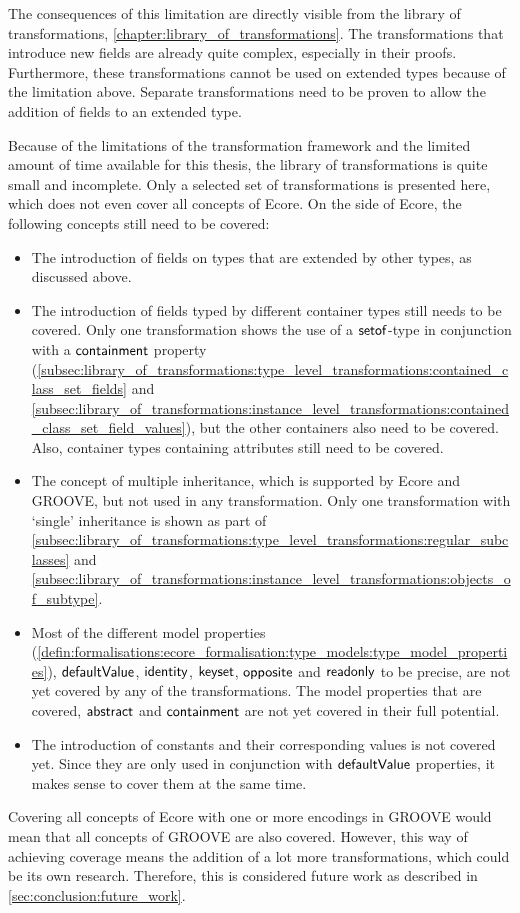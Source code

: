 The consequences of this limitation are directly visible from the library of transformations, \cref{chapter:library_of_transformations}. The transformations that introduce new fields are already quite complex, especially in their proofs. Furthermore, these transformations cannot be used on extended types because of the limitation above. Separate transformations need to be proven to allow the addition of fields to an extended type. 

Because of the limitations of the transformation framework and the limited amount of time available for this thesis, the library of transformations is quite small and incomplete. Only a selected set of transformations is presented here, which does not even cover all concepts of Ecore. On the side of Ecore, the following concepts still need to be covered:
\begin{itemize}
    \item The introduction of fields on types that are extended by other types, as discussed above.
    \item The introduction of fields typed by different container types still needs to be covered. Only one transformation shows the use of a $\mathsf{setof}$-type in conjunction with a $\mathsf{containment}$ property (\cref{subsec:library_of_transformations:type_level_transformations:contained_class_set_fields} and \cref{subsec:library_of_transformations:instance_level_transformations:contained_class_set_field_values}), but the other containers also need to be covered. Also, container types containing attributes still need to be covered.
    \item The concept of multiple inheritance, which is supported by Ecore and GROOVE, but not used in any transformation. Only one transformation with `single' inheritance is shown as part of \cref{subsec:library_of_transformations:type_level_transformations:regular_subclasses} and \cref{subsec:library_of_transformations:instance_level_transformations:objects_of_subtype}.
    \item Most of the different model properties (\cref{defin:formalisations:ecore_formalisation:type_models:type_model_properties}), $\mathsf{defaultValue}$, $\mathsf{identity}$, $\mathsf{keyset}$, $\mathsf{opposite}$ and $\mathsf{readonly}$ to be precise, are not yet covered by any of the transformations. The model properties that are covered, $\mathsf{abstract}$ and $\mathsf{containment}$ are not yet covered in their full potential.
    \item The introduction of constants and their corresponding values is not covered yet. Since they are only used in conjunction with $\mathsf{defaultValue}$ properties, it makes sense to cover them at the same time.
\end{itemize}
Covering all concepts of Ecore with one or more encodings in GROOVE would mean that all concepts of GROOVE are also covered. However, this way of achieving coverage means the addition of a lot more transformations, which could be its own research. Therefore, this is considered future work as described in \cref{sec:conclusion:future_work}.

